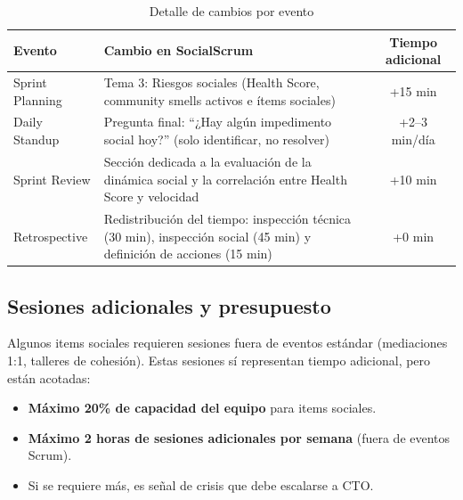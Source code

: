 \begin{table}[h]
    \centering
    \small
    \begin{tabularx}{\textwidth}{|l|X|c|}
        \hline
        \textbf{Evento} & \textbf{Cambio en SocialScrum}                                                                                       & \textbf{Tiempo adicional} \\
        \hline
        Sprint Planning
                        & Tema 3: Riesgos sociales (Health Score, community smells activos e ítems sociales)
                        & +15 min                                                                                                                                          \\
        \hline
        Daily Standup
                        & Pregunta final: “¿Hay algún impedimento social hoy?” (solo identificar, no resolver)
                        & +2--3 min/día                                                                                                                                    \\
        \hline
        Sprint Review
                        & Sección dedicada a la evaluación de la dinámica social y la correlación entre Health Score y velocidad
                        & +10 min                                                                                                                                          \\
        \hline
        Retrospective
                        & Redistribución del tiempo: inspección técnica (30 min), inspección social (45 min) y definición de acciones (15 min)
                        & +0 min                                                                                                                                           \\
        \hline
    \end{tabularx}
    \caption{Detalle de cambios por evento}
    \label{tab:detalle-overhead}
\end{table}
\FloatBarrier

\subsection{Sesiones adicionales y presupuesto}

Algunos items sociales requieren sesiones fuera de eventos estándar (mediaciones 1:1, talleres de cohesión). Estas sesiones sí representan tiempo adicional, pero están acotadas:
\begin{itemize}
    \item \textbf{Máximo 20\% de capacidad del equipo} para items sociales.
    \item \textbf{Máximo 2 horas de sesiones adicionales por semana} (fuera de eventos Scrum).
    \item Si se requiere más, es señal de crisis que debe escalarse a CTO.
\end{itemize}

